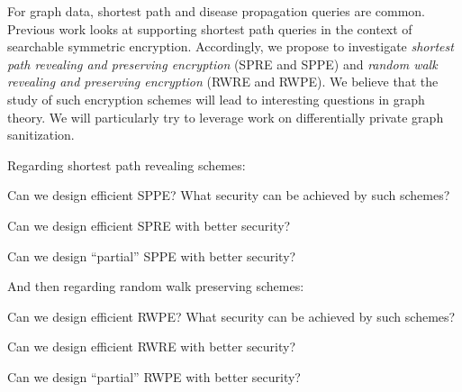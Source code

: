 For graph data, shortest path and disease propagation queries are common.  Previous work looks at supporting shortest path queries in the context of searchable symmetric encryption.  Accordingly, we propose to investigate \emph{shortest path revealing  and preserving encryption} (SPRE and SPPE) and \emph{random walk revealing and preserving encryption} (RWRE and RWPE).   We believe that the study of such encryption schemes will lead to interesting questions in graph theory.  We will particularly try to leverage work on differentially private graph sanitization. 

Regarding shortest path revealing schemes: 

\begin{question}
Can we design efficient SPPE?  What security can be achieved by such schemes?
\end{question}


\begin{question}
Can we design efficient SPRE with better security?
\end{question}

\begin{question}
Can we design ``partial'' SPPE with better security?
\end{question}

And then regarding random walk preserving schemes:

\begin{question}
Can we design efficient RWPE?  What security can be achieved by such schemes?
\end{question}


\begin{question}
Can we design efficient RWRE with better security?
\end{question}

\begin{question}
Can we design ``partial'' RWPE with better security?
\end{question}



